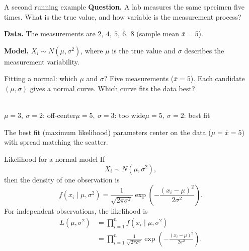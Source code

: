 \documentclass[slidestop,compress,mathserif]{beamer}
\begin{document}
\begin{frame}{A second running example}
\textbf{Question.} A lab measures the same specimen five times. What is the true value, and how variable is the measurement process?
\medskip

\textbf{Data.} The measurements are $2,\ 4,\ 5,\ 6,\ 8$ (sample mean $\bar x = 5$).
\medskip

\textbf{Model.} $X_i \sim N(\mu,\sigma^2)$, where $\mu$ is the true value and $\sigma$ describes the measurement variability.
\end{frame}

\begin{frame}{Fitting a normal: which $\mu$ and $\sigma$?}
Five measurements ($\bar x=5$). Each candidate $(\mu,\sigma)$ gives a normal curve. Which curve fits the data best?
\begin{center}
\\[0.1em]
{\scriptsize\textcolor{ccRed}{$\mu=3,\ \sigma=2$: off-center}\qquad\textcolor{ccGold}{$\mu=5,\ \sigma=3$: too wide}\qquad\textcolor{ccBlue}{$\mu=5,\ \sigma=2$: best fit}}
\end{center}
\vspace{-0.2em}
The best fit (maximum likelihood) parameters center on the data ($\mu=\bar x=5$) with spread matching the scatter. 
\end{frame}
\begin{frame}{Likelihood for a normal model}
If
\[
X_i \sim N(\mu,\sigma^2),
\]
then the density of one observation is
\[
f(x_{i} \mid \mu, \sigma^{2}) 
=
\frac{1}{\sqrt{2\pi\sigma^2}}
\exp\left(
-\frac{(x_i-\mu)^2}{2\sigma^2}
\right).
\]
For independent observations, the likelihood is
\begin{align*}
L(\mu, \sigma^{2}) 
&=
\prod_{i=1}^{n} f(x_{i} \mid \mu, \sigma^{2}) \\
&=
\prod_{i=1}^{n}
\frac{1}{\sqrt{2\pi\sigma^2}}
\exp\left(
-\frac{(x_i-\mu)^2}{2\sigma^2}
\right).
\end{align*}
\end{frame}
\end{document}
